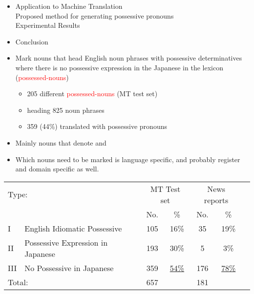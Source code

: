 \documentclass[a4paper,landscape,headrule,footrule,dvips]{foils}
\newcommand{\trg}[1]{\textcolor{red}{#1}}
\begin{document}
\begin{CJK}{UTF8}{min}
\begin{itemize}
\item Application to Machine Translation \\
Proposed method for generating possessive pronouns \\
Experimental Results 

\item Conclusion 
\end{itemize}





\begin{itemize}
\item Mark nouns that head English noun phrases with possessive
  determinatives where there is no possessive expression in the
  Japanese in the lexicon (\trg{possessed-nouns})
   \begin{itemize}
      \item 205 different \trg{possessed-nouns} (MT test set)
      \item heading 825 noun phrases
      \item 359 (44\%) translated with possessive pronouns
    \end{itemize}
\item  Mainly nouns that denote  and   
\item Which nouns need to be marked is language specific, and probably
  register and domain specific as well.
\end{itemize}
  



\noindent\begin{tabular}{llccccc}
  \multicolumn{2}{l}{Type:}  &
  \multicolumn{2}{c}{MT Test set} &
  \multicolumn{2}{c}{News reports} \\
   & & No.  & \%  & No.  & \%  \\ \hline
   I & English Idiomatic Possessive & 105 & 16\% & 35 & 19\% \\
   II & Possessive Expression in Japanese & 193 & 30\% & 5 & 3\% \\
   III &No Possessive in Japanese & 359 &  \underline{54\%}& 176 & \underline{78\%} \\
  \multicolumn{2}{l}{Total:} &  657 & & 181 & 
\end{tabular}


\end{CJK}
\end{document}
